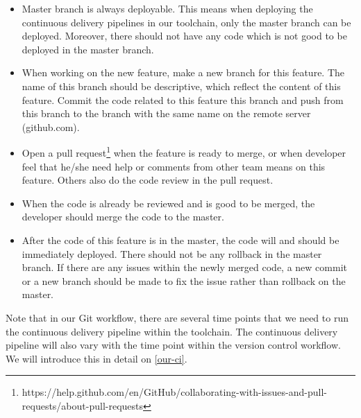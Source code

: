 \begin{itemize}
\item Master branch is always deployable. This means when deploying the continuous delivery pipelines in our toolchain, only the master branch can be deployed. Moreover, there should not have any code which is not good to be deployed in the master branch.
\item When working on the new feature, make a new branch for this feature. The name of this branch should be descriptive, which reflect the content of this feature. Commit the code related to this feature this branch and push from this branch to the branch with the same name on the remote server (github.com).
\item Open a pull request\footnote{https://help.github.com/en/GitHub/collaborating-with-issues-and-pull-requests/about-pull-requests} when the feature is ready to merge, or when developer feel that he/she need help or comments from other team means on this feature. Others also do the code review in the pull request.
\item When the code is already be reviewed and is good to be merged, the developer should merge the code to the master.
\item After the code of this feature is in the master, the code will and should be immediately deployed. There should not be any rollback in the master branch. If there are any issues within the newly merged code, a new commit or a new branch should be made to fix the issue rather than rollback on the master.
\end{itemize}
\par
Note that in our Git workflow, there are several time points that we need to run the continuous delivery pipeline within the toolchain. The continuous delivery pipeline will also vary with the time point within the version control workflow. We will introduce this in detail on \ref{our-ci}.



